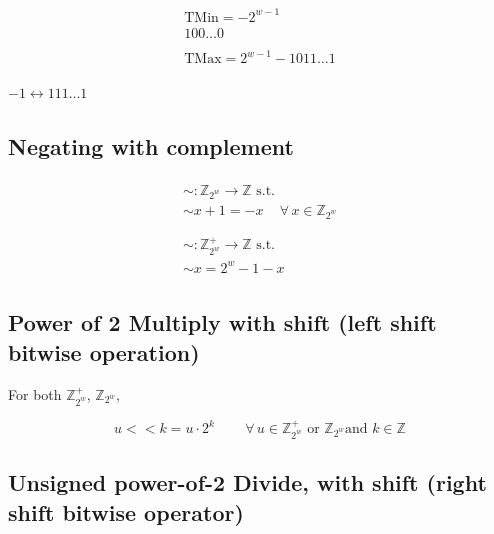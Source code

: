 \documentclass[10pt]{amsart}
\begin{document}
\begin{multicols*}{2}
\[
\begin{gathered}
\begin{gathered} 
\text{TMin} = -2^{w-1} \\
100 \dots 0 
\end{gathered} \\
\begin{gathered} 
\text{TMax} = 2^{w-1} - 1
011\dots 1
\end{gathered}
\end{gathered} 
\]

$-1 \leftrightarrow 111 \dots 1$


\subsection{Negating with complement}

\begin{equation}
\begin{gathered}
\begin{gathered} 
\sim : \mathbb{Z}_{2^w} \to \mathbb{Z} \text{ s.t. } \\
\sim x + 1 = -x \quad \, \forall \, x \in \mathbb{Z}_{2^w} \\
\end{gathered}  \\
\begin{gathered} 
\sim : \mathbb{Z}^+_{2^w} \to \mathbb{Z} \text{ s.t. } \\
\sim x = 2^w- 1 -x 
\end{gathered}
\end{gathered}
\end{equation}

\subsection{Power of 2 Multiply with shift (left shift bitwise operation) }

For both $\mathbb{Z}^+_{2^w}$, $\mathbb{Z}_{2^w}$, 

\begin{equation}
 u << k = u \cdot 2^k \qquad \, \forall \, u \in \mathbb{Z}^+_{2^w} \text{ or } \mathbb{Z}_{2^w} \text{and } k \in \mathbb{Z}
\end{equation}

\subsection{Unsigned power-of-2 Divide, with shift (right shift bitwise operator)}


\end{multicols*}
\end{document}
